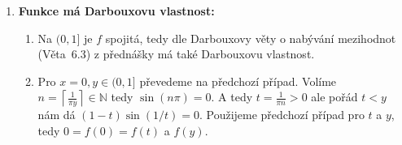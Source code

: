 \begin{enumerate}
{\begin{enumerate}
\begin{enumerate}
						\item  Chci ukázat, že pro každé $\varepsilon > 0$ existuje $z \in (0,1)$ takové, že $f(z) \geq 1-\varepsilon$
							(tedy, že supremum $f(x)$ je rovné jedné, infimum se ukáže obdobně).
							Vím, že $\sin(2k \pi + \frac{\pi}{2}) = 1$.
							Pro pohodlí zvolím dost malé $z$ tvaru $z = \frac{1}{ 2k\pi + \frac{\pi}{2}}$ (tedy volím dostatečně velké $k \in \mathbb{N}$).
							Pro dané $\varepsilon > 0$ volím $k = \left\lceil \frac{1}{\varepsilon} \right\rceil \in \mathbb{N}$ takže $z \leq \varepsilon$.
							Dostáváme tedy $\sin(z) = 1$ a tudíž $f(z) = (1 - z) \sin(z) = 1-z \geq 1 - \varepsilon$.

							Poznamenejme, že jsme teď našli posloupnost $a_n = \frac{2}{n \pi}$ takovou, že $\lim_{n \rightarrow \infty} a_n = 0$ a navíc $\lim_{n \rightarrow \infty} f(a_n) = 1$.
							Tím jsme dokázali, že supremum $f$ na intervalu $[0,1]$ je rovné jedné.
							Nic jsme tím neřekli o limitě $\lim_{x \rightarrow 0^+} f(x)$ (porovnejte s Heineho definicí limity, která chce aby $\lim f(a_n)$ byla stejná pro libovolnou takovou $a_n$).

					\end{enumerate}

				\item  \textbf{Funkce má Darbouxovu vlastnost:}
					\begin{enumerate}

						\item  Na $(0,1]$ je $f$ spojitá, tedy dle Darbouxovy věty o nabývání mezihodnot (Věta~6.3) z přednášky má také Darbouxovu vlastnost.

						\item  Pro $x = 0, y \in (0,1]$ převedeme na předchozí případ.
							Volíme $n = \left\lceil \frac{1}{\pi y} \right\rceil \in \mathbb{N}$ tedy $\sin(n \pi) = 0$.
							A tedy $t = \frac{1}{\pi n} > 0$ ale pořád $t < y$ nám dá $\left( 1 - t \right) \sin(1/t) = 0$.
							Použijeme předchozí případ pro $t$ a $y$, tedy $0 = f(0) = f(t)$ a $f(y)$.

					\end{enumerate}

			\end{enumerate}
		}

\end{enumerate}

